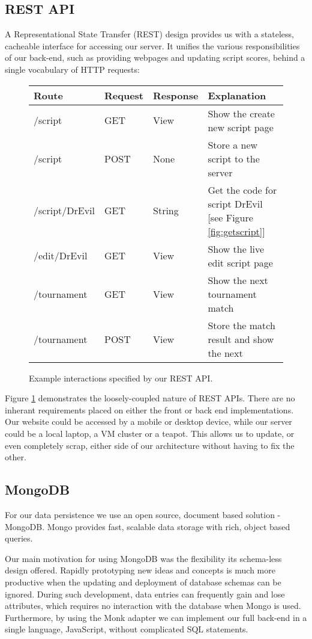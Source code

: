 \subsection{REST API}
A Representational State Transfer (REST) design provides us with a stateless, cacheable interface for accessing our server. It unifies the various responsibilities of our back-end, such as providing webpages and updating script scores, behind a single vocabulary of HTTP requests:
\begin{figure}[H]
\centering
\begin{tabular}{| l | l | l | l |}\hline
Route & Request &  Response & Explanation\\\hline\hline
/script & GET & View & Show the create new script page\\\hline
/script & POST & None & Store a new script to the server\\\hline
/script/DrEvil & GET & String & Get the code for script DrEvil [see Figure \ref{fig:getscript}]\\\hline
/edit/DrEvil & GET & View & Show the live edit script page\\\hline
/tournament & GET & View & Show the next tournament match\\\hline
/tournament & POST & View & Store the match result and show the next \\\hline
\end{tabular}
\caption{Example interactions specified by our REST API.}
\label{fig:api}
\end{figure}

Figure \ref{fig:api} demonstrates the loosely-coupled nature of REST APIs. There are no inherant requirements placed on either the front or back end implementations. Our website could be accessed by a mobile or desktop device, while our server could be a local laptop, a VM cluster or a teapot\cite{rfc}. This allows us to update, or even completely scrap, either side of our architecture without having to fix the other.

\subsection{MongoDB}
For our data persistence we use an open source, document based solution - MongoDB\cite{mongo}. Mongo provides fast, scalable data storage with rich, object based queries.

Our main motivation for using MongoDB was the flexibility its schema-less design offered\cite{whymongo}. Rapidly prototyping new ideas and concepts is much more productive when the updating and deployment of database schemas can be ignored. During such development, data entries can frequently gain and lose attributes, which requires no interaction with the database when Mongo is used. Furthermore, by using the Monk adapter we can implement our full back-end in a single language, JavaScript, without complicated SQL statements.

